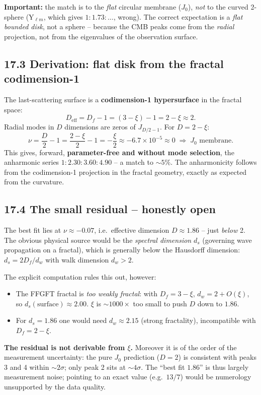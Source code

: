 \textbf{Important:} the match is to the \emph{flat} circular membrane ($J_0$),
\emph{not} to the curved 2-sphere (Y$_{\ell m}$, which gives $1:1.73:\ldots$,
wrong). The correct expectation is a \emph{flat bounded disk}, not a sphere --
because the CMB peaks come from the \emph{radial} projection, not from the
eigenvalues of the observation surface.

\subsection*{17.3 Derivation: flat disk from the fractal codimension-1}

The last-scattering surface is a \textbf{codimension-1 hypersurface} in the
fractal space:
\[
  D_\mathrm{eff} = D_f - 1 = (3-\xi) - 1 = 2 - \xi \approx 2.
\]
Radial modes in $D$ dimensions are zeros of $J_{D/2-1}$. For $D = 2-\xi$:
\[
  \nu = \frac{D}{2}-1 = \frac{2-\xi}{2}-1 = -\frac{\xi}{2}
      \approx -6.7\times10^{-5} \approx 0
  \;\Rightarrow\; J_0\text{ membrane}.
\]
This gives, forward, \textbf{parameter-free and without mode selection}, the
anharmonic series $1:2.30:3.60:4.90$ -- a match to $\sim5\%$. The anharmonicity
follows from the codimension-1 projection in the fractal geometry, exactly as
expected from the curvature.

\subsection*{17.4 The small residual -- honestly open}

The best fit lies at $\nu\approx-0.07$, i.e.\ effective dimension
$D\approx1.86$ -- just \emph{below} 2. The obvious physical source would be the
\emph{spectral dimension} $d_s$ (governing wave propagation on a fractal),
which is generally below the Hausdorff dimension: $d_s = 2D_f/d_w$ with walk
dimension $d_w>2$.

The explicit computation rules this out, however:
\begin{itemize}
  \item The FFGFT fractal is \emph{too weakly fractal}: with $D_f=3-\xi$,
        $d_w = 2+O(\xi)$, so $d_s(\text{surface})\approx2.00$. $\xi$ is
        $\sim1000\times$ too small to push $D$ down to $1.86$.
  \item For $d_s=1.86$ one would need $d_w\approx2.15$ (strong fractality),
        incompatible with $D_f=2-\xi$.
\end{itemize}
\textbf{The residual is not derivable from $\xi$.} Moreover it is of the order
of the measurement uncertainty: the pure $J_0$ prediction ($D=2$) is consistent
with peaks 3 and 4 within $\sim2\sigma$; only peak 2 sits at $\sim4\sigma$. The
``best fit $1.86$'' is thus largely measurement noise; pointing to an exact
value (e.g.\ $13/7$) would be numerology unsupported by the data quality.

